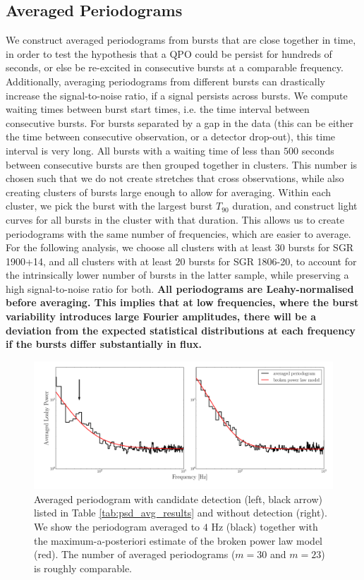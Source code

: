 \documentclass[numberedappendix]{emulateapj}
\newcommand{\hz}{\,\mathrm{Hz}}
\begin{document}
\subsection{Averaged Periodograms}
\label{sec:psd_average}
We construct averaged periodograms from bursts that are close together in time, in order to test the hypothesis that a QPO could be persist for hundreds of seconds, or else be re-excited in consecutive bursts at a comparable frequency. Additionally, averaging periodograms from different bursts can drastically increase the signal-to-noise ratio, if a signal persists across bursts. We compute waiting times between burst start times, i.e. the time interval between consecutive bursts. For bursts separated by a gap in the data (this can be either the time between consecutive observation, or a detector drop-out), this time interval is very long. All bursts with a waiting time of less than $500$ seconds between consecutive bursts are then grouped together in clusters. This number is chosen such that we do not create stretches that cross observations, while also creating clusters of bursts large enough to allow for averaging. Within each cluster, we pick the burst with the largest burst $T_{90}$ duration, and construct light curves for all bursts in the cluster with that duration. This allows us to create periodograms with the same number of frequencies, which are easier to average. For the following analysis, we choose all clusters with at least 30 bursts for SGR 1900+14, and all clusters with at least 20 bursts for SGR 1806-20, to account for the intrinsically lower number of bursts in the latter sample, while preserving a high signal-to-noise ratio for both. \textbf{All periodograms are Leahy-normalised before averaging. This implies that at low frequencies, where the burst variability introduces large Fourier amplitudes, there will be a deviation from the expected statistical distributions at each frequency if the bursts differ substantially in flux.}

\begin{figure}[htbp]
\begin{center}
\includegraphics[width=\textwidth]{f3.pdf}
\caption{Averaged periodogram with candidate detection (left, black arrow) listed in Table \ref{tab:psd_avg_results} and without detection (right). We show the periodogram averaged to $4 \,\hz$ (black) together with the maximum-a-posteriori estimate of
the broken power law model (red). The number of averaged periodograms ($m=30$ and $m=23$) is roughly comparable.}
\label{fig:psavg_comp}
\end{center}
\end{figure}
\end{document}

